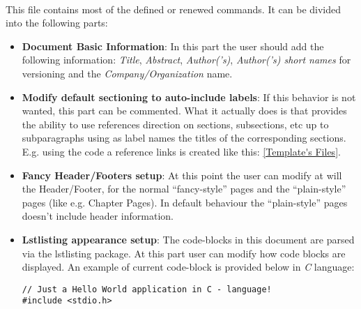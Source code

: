\begin{description}
\item{\textbf{}} \hfill \\
This file contains most of the defined or renewed commands. It can be divided into the following parts:
\begin{itemize}
\item{\textbf{Document Basic Information}}: In this part the user should add the following information: \textit{Title}, \textit{Abstract}, \textit{Author('s)}, \textit{Author('s) short names} for versioning and the \textit{Company/Organization} name.
\item{\textbf{Modify default sectioning to auto-include labels}}: If this behavior is not wanted, this part can be commented. What it actually does is that provides the ability to use references direction on sections, subsections, etc up to subparagraphs using as label names the titles of the corresponding sections. E.g. using the  code a reference links is created like this: \ref{Template's Files}.
\item{\textbf{Fancy Header/Footers setup}}: At this point the user can modify at will the Header/Footer, for the normal ``fancy-style'' pages and the ``plain-style'' pages (like e.g. Chapter Pages). In default behaviour the ``plain-style'' pages doesn't include header information.
\item{\textbf{Lstlisting appearance setup}}: The code-blocks in this document are parsed via the lstlisting package. At this part user can modify how code blocks are displayed. An example of current code-block is provided below in \textit{C} language:
\lstset{language=c}
\begin{lstlisting}
// Just a Hello World application in C - language!
#include <stdio.h>


\end{lstlisting}
\end{itemize}
\end{description}

